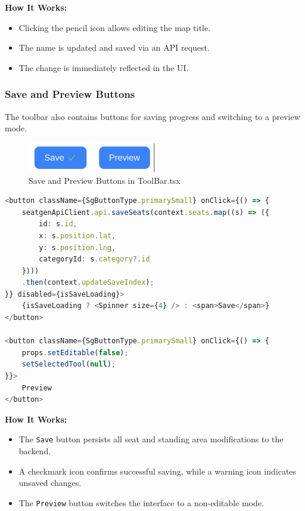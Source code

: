 \textbf{How It Works:}
\begin{itemize}
    \item Clicking the pencil icon allows editing the map title.
    \item The name is updated and saved via an API request.
    \item The change is immediately reflected in the UI.
\end{itemize}

\subsubsection{Save and Preview Buttons}
The toolbar also contains buttons for saving progress and switching to a preview mode.

\begin{figure}[H]
    \centering
    \includegraphics[width=0.5\textwidth]{pics/toolbar02.png}
    \caption{Save and Preview Buttons in ToolBar.tsx}
    \label{fig:toolbar-save-preview}
\end{figure}

\begin{lstlisting}[language=TypeScript, caption=Saving and Previewing, label=lst:toolbar-save-preview]
<button className={SgButtonType.primarySmall} onClick={() => {
    seatgenApiClient.api.saveSeats(context.seats.map((s) => ({
        id: s.id,
        x: s.position.lat,
        y: s.position.lng,
        categoryId: s.category?.id
    })))
    .then(context.updateSaveIndex);
}} disabled={isSaveLoading}>
    {isSaveLoading ? <Spinner size={4} /> : <span>Save</span>}
</button>

<button className={SgButtonType.primarySmall} onClick={() => {
    props.setEditable(false);
    setSelectedTool(null);
}}>
    Preview
</button>
\end{lstlisting}

\textbf{How It Works:}
\begin{itemize}
    \item The \texttt{Save} button persists all seat and standing area modifications to the backend.
    \item A checkmark icon confirms successful saving, while a warning icon indicates unsaved changes.
    \item The \texttt{Preview} button switches the interface to a non-editable mode.
\end{itemize}

